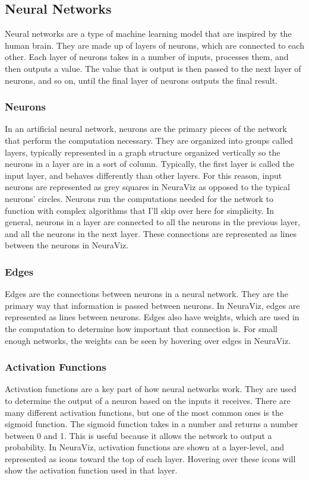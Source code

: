 \subsection{Neural Networks} \label{sec:neural_networks}
Neural networks are a type of machine learning model that are inspired by the human brain. They are made up of layers of neurons, which are connected to each other. Each layer of neurons takes in a number of inputs, processes them, and then outputs a value. The value that is output is then passed to the next layer of neurons, and so on, until the final layer of neurons outputs the final result.

\subsubsection{Neurons}
In an artificial neural network, neurons are the primary pieces of the network that perform the computation necessary. They are organized into groups called layers, typically represented in a graph structure organized vertically so the neurons in a layer are in a sort of column. Typically, the first layer is called the input layer, and behaves differently than other layers. For this reason, input neurons are represented as grey squares in NeuraViz as opposed to the typical neurons' circles. Neurons run the computations needed for the network to function with complex algorithms that I'll skip over here for simplicity. In general, neurons in a layer are connected to all the neurons in the previous layer, and all the neurons in the next layer. These connections are represented as lines between the neurons in NeuraViz.

\subsubsection{Edges}
Edges are the connections between neurons in a neural network. They are the primary way that information is passed between neurons. In NeuraViz, edges are represented as lines between neurons. Edges also have weights, which are used in the computation to determine how important that connection is. For small enough networks, the weights can be seen by hovering over edges in NeuraViz.

\subsubsection{Activation Functions}
Activation functions are a key part of how neural networks work. They are used to determine the output of a neuron based on the inputs it receives. There are many different activation functions, but one of the most common ones is the sigmoid function. The sigmoid function takes in a number and returns a number between 0 and 1. This is useful because it allows the network to output a probability. In NeuraViz, activation functions are shown at a layer-level, and represented as icons toward the top of each layer. Hovering over these icons will show the activation function used in that layer.
